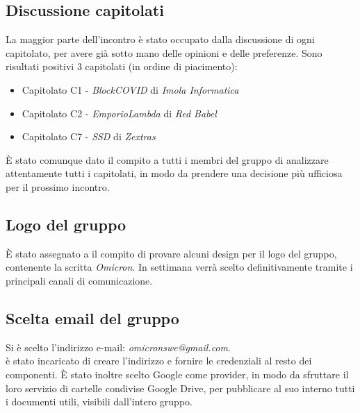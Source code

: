 \documentclass[12pt]{article}
\begin{document}
	\subsection{Discussione capitolati}
	La maggior parte dell'incontro è stato occupato dalla discussione di ogni capitolato, per avere già sotto mano delle opinioni e delle preferenze. Sono risultati positivi 3 capitolati (in ordine di piacimento):
	\begin{itemize}
		\item Capitolato C1 - \textit{BlockCOVID} di \textit{Imola Informatica}
		\item Capitolato C2 - \textit{EmporioLambda} di \textit{Red Babel}
		\item Capitolato C7 - \textit{SSD} di \textit{Zextras}
	\end{itemize}
	È stato comunque dato il compito a tutti i membri del gruppo di analizzare attentamente tutti i capitolati, in modo da prendere una decisione più ufficiosa per il prossimo incontro.
	
	\subsection{Logo del gruppo}
	È stato assegnato a \NM{} il compito di provare alcuni design per il logo del gruppo, contenente la scritta \textit{Omicron}. In settimana verrà scelto definitivamente tramite i principali canali di comunicazione.
	
	\subsection{Scelta email del gruppo}
	Si è scelto l'indirizzo e-mail: \textit{omicronswe@gmail.com}.\\
	\MDI{} è stato incaricato di creare l'indirizzo e fornire le credenziali al resto dei componenti. È stato inoltre scelto Google come provider, in modo da sfruttare il loro servizio di cartelle condivise Google Drive, per pubblicare al suo interno tutti i documenti utili, visibili dall'intero gruppo.
	
\end{document}
